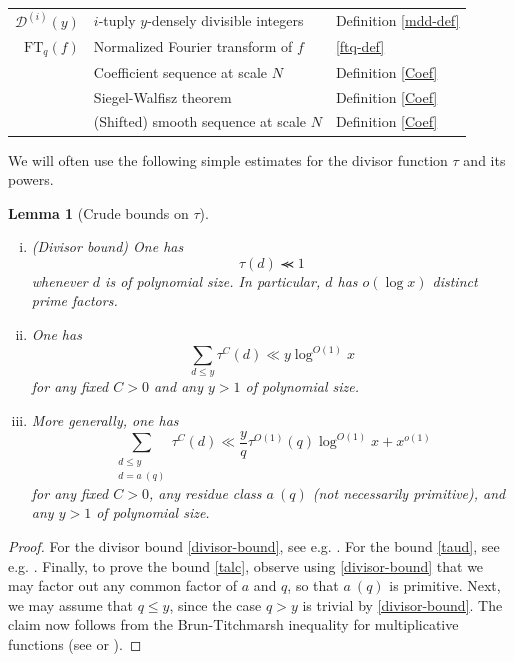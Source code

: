 \documentclass[12pt,a4paper,reqno]{amsart}
\numberwithin{equation}{section}
\newcommand{\FT}{\mathrm{FT}}
\theoremstyle{plain}
\newtheorem{lemma}[theorem]{Lemma}
\theoremstyle{definition}
\renewcommand{\lessapprox}{\llcurly}
\begin{document}
\begin{table}[htbp]
\begin{center}
\begin{tabular}{r p{7cm} p{3cm}}
${\mathcal D}^{(i)}(y)$ & $i$-tuply $y$-densely divisible integers & Definition \ref{mdd-def}\\
$\FT_q(f)$ & Normalized Fourier transform of $f$ & \eqref{ftq-def} \\
\midrule
& Coefficient sequence at scale $N$ & Definition \ref{Coef}\\
& Siegel-Walfisz theorem & Definition \ref{Coef} \\
& (Shifted) smooth sequence at scale $N$ & Definition \ref{Coef} \\
\bottomrule
\end{tabular}
\end{center}
\label{tab:notation}
\end{table}

We will often use the following simple estimates for the divisor
function $\tau$ and its powers.

\begin{lemma}[Crude bounds on $\tau$]\label{divisor-crude}\ 
\begin{enumerate}[(i)]
\item\label{div-bound} (Divisor bound) One has
\begin{equation}\label{divisor-bound}
\tau(d) \lessapprox 1
\end{equation}
whenever $d$ is of polynomial size.  In particular, $d$ has $o(\log
x)$ distinct prime factors.
\item\label{taud-bound} One has
\begin{equation}\label{taud}
\sum_{d \leq y} \tau^C(d) \ll y \log^{O(1)} x 
\end{equation}
for any fixed $C>0$ and any $y > 1$ of polynomial size.  
\item\label{talc-bound} More generally, one has
\begin{equation}\label{talc}
\sum_{\substack{d \leq y\\ d = a\ (q)}} \tau^C(d) \ll \frac{y}{q} \tau^{O(1)}(q) \log^{O(1)} x + x^{o(1)}
\end{equation}
for any fixed $C>0$, any residue class $a\ (q)$ (not necessarily primitive), and any $y>1$ of polynomial size.
\end{enumerate}
\end{lemma}

\begin{proof}  For the divisor bound \eqref{divisor-bound}, see
  e.g. \cite[Theorem 2.11]{mv-book}.  For the bound \eqref{taud}, see
  e.g. \cite[Corollary 2.15]{mv-book}.  Finally, to prove the bound
  \eqref{talc}, observe using \eqref{divisor-bound} that we may factor
  out any common factor of $a$ and $q$, so that $a\ (q)$ is primitive.
  Next, we may assume that $q \leq y$, since the case  $q>y$ is
  trivial by \eqref{divisor-bound}.  The claim now follows from the Brun-Titchmarsh inequality for multiplicative functions (see \cite{shiu} or \cite{barban}).
\end{proof}
\end{document}
